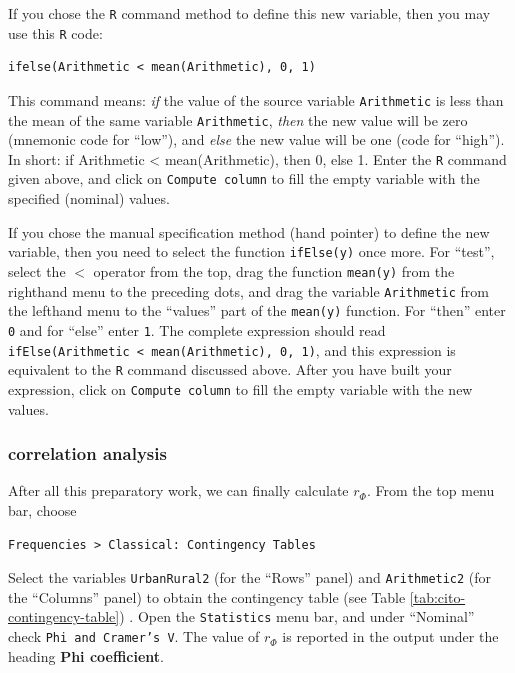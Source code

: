 \documentclass[
]{book}
\begin{document}
If you chose the \texttt{R} command method to define this new variable, then you may use this \texttt{R} code:

\begin{verbatim}
ifelse(Arithmetic < mean(Arithmetic), 0, 1)
\end{verbatim}

This command means: \emph{if} the value of the source variable \texttt{Arithmetic} is less than the mean of the same variable \texttt{Arithmetic}, \emph{then} the new value will be zero (mnemonic code for ``low''), and \emph{else} the new value will be one (code for ``high''). In short: if Arithmetic \textless{} mean(Arithmetic), then 0, else 1. Enter the \texttt{R} command given above, and click on \texttt{Compute\ column} to fill the empty variable with the specified (nominal) values.

If you chose the manual specification method (hand pointer) to define the new variable, then you need to select the function \texttt{ifElse(y)} once more. For ``test'', select the \(<\) operator from the top, drag the function \texttt{mean(y)} from the righthand menu to the preceding dots, and drag the variable \texttt{Arithmetic} from the lefthand menu to the ``values'' part of the \texttt{mean(y)} function. For ``then'' enter \texttt{0} and for ``else'' enter \texttt{1}. The complete expression should read \texttt{ifElse(Arithmetic\ \textless{}\ mean(Arithmetic),\ 0,\ 1)}, and this expression is equivalent to the \texttt{R} command discussed above.
After you have built your expression, click on \texttt{Compute\ column} to fill the empty variable with the new values.

\subsubsection{correlation analysis}\label{correlation-analysis-1}

After all this preparatory work, we can finally calculate \(r_\Phi\). From the top menu bar, choose

\begin{verbatim}
Frequencies > Classical: Contingency Tables
\end{verbatim}

Select the variables \texttt{UrbanRural2} (for the ``Rows'' panel) and \texttt{Arithmetic2} (for the ``Columns'' panel) to obtain the contingency table (see Table \ref{tab:cito-contingency-table}) .
Open the \texttt{Statistics} menu bar, and under ``Nominal'' check \texttt{Phi\ and\ Cramer’s\ V}.
The value of \(r_\Phi\) is reported in the output under the heading \textbf{Phi coefficient}.
\end{document}
